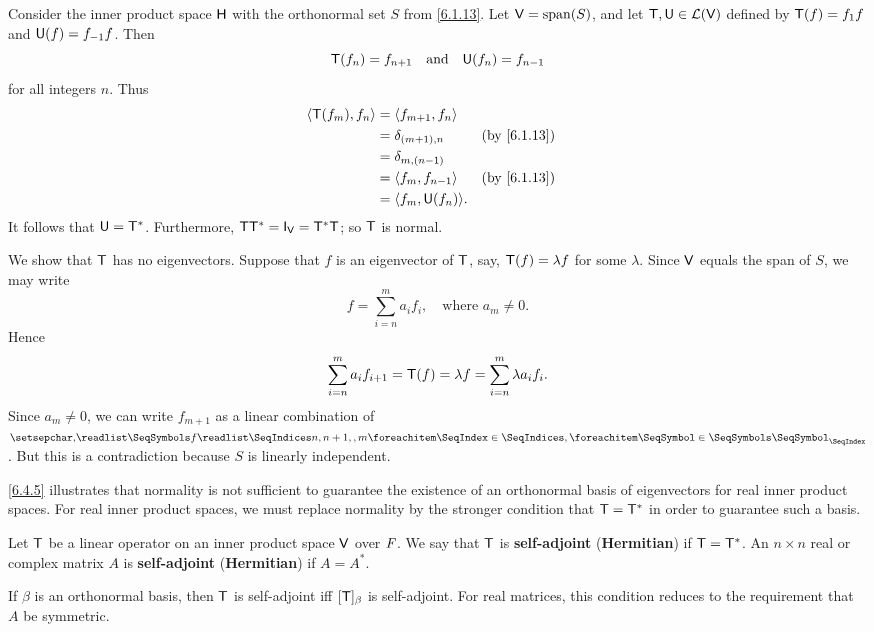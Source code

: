 \begin{eg}\label{6.4.7}
	Consider the inner product space \(\mathsf{H}\) with the orthonormal set \(S\) from \cref{6.1.13}.
	Let \(\V = \spn{S}\), and let \(\mathsf{T}, \mathsf{U} \in \mathcal{L}(\mathsf{V})\) defined by \(\mathsf{T}(f) = f_1 f\) and \(\mathsf{U}(f) = f_{-1} f\).
	Then
	\[
		\mathsf{T}(f_n) = f_{n + 1} \quad \text{and} \quad \mathsf{U}(f_n) = f_{n - 1}
	\]
	for all integers \(n\).
	Thus
	\begin{align*}
		\inn{\T(f_m), f_n} & = \inn{f_{m + 1}, f_n}                  \\
		                   & = \delta_{(m + 1), n}  &  & \by{6.1.13} \\
		                   & = \delta_{m, (n - 1)}                   \\
		                   & = \inn{f_m, f_{n - 1}} &  & \by{6.1.13} \\
		                   & = \inn{f_m, \U(f_n)}.
	\end{align*}
	It follows that \(\mathsf{U} = \mathsf{T}^*\).
	Furthermore, \(\T \T^* = \IT[\V] = \T^* \T\);
	so \(\mathsf{T}\) is normal.

	We show that \(\mathsf{T}\) has no eigenvectors.
	Suppose that \(f\) is an eigenvector of \(\mathsf{T}\), say, \(\mathsf{T}(f) = \lambda f\) for some \(\lambda\).
	Since \(\mathsf{V}\) equals the span of \(S\), we may write
	\[
		f = \sum_{i = n}^m a_i f_i, \quad \text{where } a_m \neq 0.
	\]
	Hence
	\[
		\sum_{i = n}^m a_i f_{i + 1} = \mathsf{T}(f) = \lambda f = \sum_{i = n}^m \lambda a_i f_i.
	\]
	Since \(a_m \neq 0\), we can write \(f_{m + 1}\) as a linear combination of \(\seq{f}{n,n+1,,m}\).
	But this is a contradiction because \(S\) is linearly independent.
\end{eg}

\begin{note}
	\cref{6.4.5} illustrates that normality is not sufficient to guarantee the existence of an orthonormal basis of eigenvectors for real inner product spaces.
	For real inner product spaces, we must replace normality by the stronger condition that \(\mathsf{T} = \mathsf{T}^*\) in order to guarantee such a basis.
\end{note}

\begin{defn}\label{6.4.8}
	Let \(\mathsf{T}\) be a linear operator on an inner product space \(\mathsf{V}\) over \(\mathit{F}\).
	We say that \(\mathsf{T}\) is \textbf{self-adjoint} (\textbf{Hermitian}) if \(\mathsf{T} = \mathsf{T}^*\).
	An \(n \times n\) real or complex matrix \(A\) is \textbf{self-adjoint} (\textbf{Hermitian}) if \(A = A^*\).
\end{defn}

\begin{cor}\label{6.4.9}
	If \(\beta\) is an orthonormal basis, then \(\mathsf{T}\) is self-adjoint iff \([\mathsf{T}]_{\beta}\) is self-adjoint.
	For real matrices, this condition reduces to the requirement that \(A\) be symmetric.
\end{cor}

